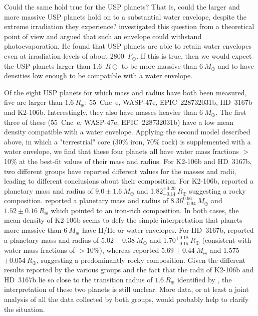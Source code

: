 \documentclass[twocolumn]{aastex61}
\begin{document}
Could the same hold true for the USP planets?
That is, could the larger and more massive USP planets hold on to a substantial water envelope, despite the extreme irradiation they experience?
\citet{Lopez2016} investigated this question from a theoretical point of view and argued that such an envelope could withstand photoevaporation.  He found that USP planets are able to retain water
envelopes even at irradiation levels of about 2800~$F_{\oplus}$.  If this is true, then we would
expect the USP planets larger than
1.6~$R{\oplus}$ to be more massive than $6~M_\oplus$ and
to have densities low enough to be compatible
with a water envelope.

Of the eight USP planets for which mass and radius have both been measured, five are
larger than $1.6~R_{\oplus}$: 55~Cnc~e, WASP-47e, EPIC~228732031b, HD~3167b and K2-106b. Interestingly, they also have masses heavier than $6~M_{\oplus}$. The first three of these (55~Cnc~e, WASP-47e, EPIC~228732031b) have a low mean density compatible with a
water envelope. Applying the second model described above, in which a "terrestrial" core (30\% iron, 70\% rock) is supplemented with
a water envelope, we find that these four planets all have water mass fractions $>$10\% at the best-fit values of their mass and radius. For K2-106b and HD~3167b,
two different groups have reported
different values for the masses and radii, leading to different conclusions about their composition. For K2-106b, \citet{Sinukoff2017} reported a planetary mass and radius of $9.0 \pm 1.6~M_{\oplus}$ and 1.82$^{+0.20}_{-0.14}~R_{\oplus}$ suggesting a rocky composition. \citet{Guenther2017} reported a planetary mass and radius of $8.36^{0.96}_{-0.94}~M_{\oplus}$ and $1.52 \pm 0.16 ~R_{\oplus}$ which pointed to an iron-rich composition. In both cases, the mean density of K2-106b seems to defy the simple interpretation that planets
more massive than $6~M_\oplus$ have H/He or water
envelopes. For HD~3167b, \citet{Christiansen2017} reported a planetary mass and radius of $5.02 \pm 0.38~M_{\oplus}$ and 1.70$^{+0.18}_{-0.15}~R_{\oplus}$ (consistent with water mass fractions of $>$10\%), whereas \citet{Gandolfi2017} reported $5.69 \pm 0.44~M_{\oplus}$ and 1.575$\pm 0.054~R_{\oplus}$, suggesting a predominantly rocky composition. Given the different results reported by the various groups and the fact that the radii of K2-106b and HD~3167b lie so close to the transition radius of $1.6~R_{\oplus}$ identified by \citet{Rogers2015}, the interpretation of these two planets is still unclear. More data, or at least a joint analysis of all the data
collected by both groups,
would probably help to clarify the situation.
\end{document}
